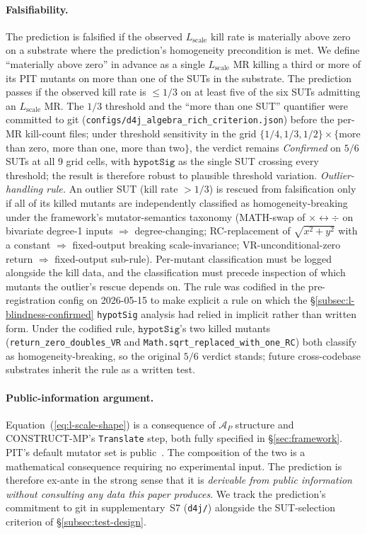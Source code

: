 \documentclass[acmsmall,screen,review]{acmart}
\begin{document}
\paragraph{Falsifiability.}
The prediction is falsified if the observed
$L_{\mathrm{scale}}$ kill rate is materially above zero on a substrate
where the prediction's homogeneity precondition is met. We define
``materially above zero'' in advance as a single $L_{\mathrm{scale}}$
MR killing a third or more of its PIT mutants on more than one of the
SUTs in the substrate. The prediction passes if the observed kill
rate is $\le 1/3$ on at least five of the six SUTs admitting an
$L_{\mathrm{scale}}$ MR. The $1/3$ threshold and the ``more than one
SUT'' quantifier were committed to git
(\texttt{configs/d4j\_algebra\_rich\_criterion.json}) before the
per-MR kill-count files; under threshold sensitivity in the grid
$\{1/4, 1/3, 1/2\} \times \{$more than zero, more than one, more
than two$\}$, the verdict remains \emph{Confirmed} on $5/6$ SUTs at
all 9 grid cells, with $\texttt{hypotSig}$ as the single SUT
crossing every threshold; the result is therefore robust to
plausible threshold variation. \emph{Outlier-handling rule.} An
outlier SUT (kill rate $> 1/3$) is rescued from falsification only
if all of its killed mutants are independently classified as
homogeneity-breaking under the framework's mutator-semantics
taxonomy (MATH-swap of $\times \leftrightarrow \div$ on bivariate
degree-1 inputs $\Rightarrow$ degree-changing; RC-replacement of
$\sqrt{x^2 + y^2}$ with a constant $\Rightarrow$ fixed-output
breaking scale-invariance; VR-unconditional-zero return
$\Rightarrow$ fixed-output sub-rule). Per-mutant classification
must be logged alongside the kill data, and the classification
must precede inspection of which mutants the outlier's rescue
depends on. The rule was codified in the pre-registration config
on 2026-05-15 to make explicit a rule on which the
\S\ref{subsec:l-blindness-confirmed} \texttt{hypotSig} analysis had
relied in implicit rather than written form. Under the
codified rule, $\texttt{hypotSig}$'s two killed mutants
(\texttt{return\_zero\_doubles\_VR} and
\texttt{Math.sqrt\_replaced\_with\_one\_RC}) both classify as
homogeneity-breaking, so the original $5/6$ verdict stands; future
cross-codebase substrates inherit the rule as a written test.

\paragraph{Public-information argument.}
Equation~(\ref{eq:l-scale-shape}) is a consequence of $\mathcal{A}_P$
structure and CONSTRUCT-MP's \texttt{Translate} step, both fully
specified in \S\ref{sec:framework}. PIT's default mutator set is
public~\cite{Coles2016PIT}. The composition of the two is a
mathematical consequence requiring no experimental input. The
prediction is therefore ex-ante in the strong sense that it is
\emph{derivable from public information without consulting any data
this paper produces}. We track the prediction's commitment to
git in supplementary~S7 (\texttt{d4j/}) alongside the SUT-selection
criterion of \S\ref{subsec:test-design}.
\end{document}
